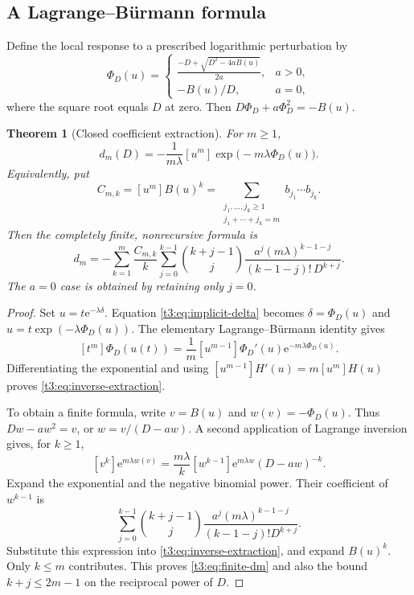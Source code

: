 \documentclass[11pt,openany]{book}
\numberwithin{equation}{chapter}
\theoremstyle{plain}
\newtheorem{theorem}{Theorem}[chapter]
\theoremstyle{definition}
\theoremstyle{remark}
\newcommand{\ee}{\mathrm e}
\newcommand{\coefB}[2]{[#1^{#2}]}             %
\begin{document}
\subsection{A Lagrange--B\"urmann formula}

Define the local response to a prescribed logarithmic perturbation by
\begin{equation}\label{t3:eq:phi}
 \Phi_D(u)=\begin{cases}
 \displaystyle\frac{-D+\sqrt{D^2-4aB(u)}}{2a},&a>0,\\[0.8em]
 -B(u)/D,&a=0,
 \end{cases}
\end{equation}
where the square root equals $D$ at zero. Then $D\Phi_D+a\Phi_D^2=-B(u)$.

\begin{theorem}[Closed coefficient extraction]\label{t3:thm:coefficient}
For $m\ge1$,
\begin{equation}\label{t3:eq:inverse-extraction}
 \boxed{\displaystyle
 d_m(D)=-\frac1{m\lambda}\coefB{u}{m}
          \exp\bigl(-m\lambda\Phi_D(u)\bigr).}
\end{equation}
Equivalently, put
\begin{equation}\label{t3:eq:Cmk}
 C_{m,k}=\coefB{u}{m}B(u)^k
 =\sum_{\substack{j_1,\ldots,j_k\ge1\\j_1+\cdots+j_k=m}}
       b_{j_1}\cdots b_{j_k}.
\end{equation}
Then the completely finite, nonrecursive formula is
\begin{equation}\label{t3:eq:finite-dm}
 \boxed{\displaystyle
 d_m=-\sum_{k=1}^m\frac{C_{m,k}}{k}
 \sum_{j=0}^{k-1}\binom{k+j-1}{j}
 \frac{a^j(m\lambda)^{k-1-j}}
 {(k-1-j)!\,D^{k+j}}.}
\end{equation}
The $a=0$ case is obtained by retaining only $j=0$.
\end{theorem}

\begin{proof}
Set $u=t\ee^{-\lambda\delta}$. Equation \eqref{t3:eq:implicit-delta} becomes
$\delta=\Phi_D(u)$ and $u=t\exp(-\lambda\Phi_D(u))$.
The elementary Lagrange--B\"urmann identity gives
\[
 [t^m]\Phi_D(u(t))
 =\frac1m[u^{m-1}]\Phi_D'(u)\ee^{-m\lambda\Phi_D(u)}.
\]
Differentiating the exponential and using
$[u^{m-1}]H'(u)=m[u^m]H(u)$ proves \eqref{t3:eq:inverse-extraction}.

To obtain a finite formula, write $v=B(u)$ and
$w(v)=-\Phi_D(u)$. Thus $Dw-aw^2=v$, or
$w=v/(D-aw)$. A second application of Lagrange inversion gives, for $k\ge1$,
\[
 [v^k]\ee^{m\lambda w(v)}
 =\frac{m\lambda}{k}[w^{k-1}]
      \ee^{m\lambda w}(D-aw)^{-k}.
\]
Expand the exponential and the negative binomial power. Their coefficient of $w^{k-1}$ is
\[
 \sum_{j=0}^{k-1}\binom{k+j-1}{j}
 \frac{a^j(m\lambda)^{k-1-j}}{(k-1-j)!D^{k+j}}.
\]
Substitute this expression into \eqref{t3:eq:inverse-extraction}, and expand $B(u)^k$. Only $k\le m$ contributes. This proves \eqref{t3:eq:finite-dm} and also the bound $k+j\le2m-1$ on the reciprocal power of $D$.
\end{proof}
\end{document}
